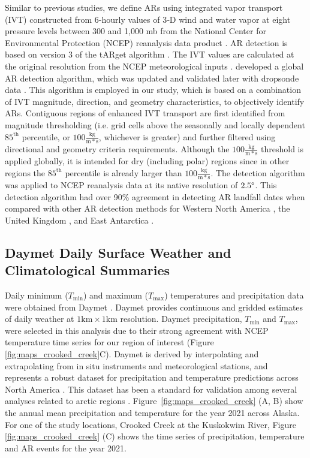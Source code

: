 \documentclass[12pts,draft]{AR_analysis_}
\begin{document}
Similar to previous studies, we define ARs using integrated vapor
transport (IVT) constructed from 6-hourly values of 3‐D wind and
water vapor at eight pressure levels between 300 and 1,000
mb from the National Center for Environmental Protection (NCEP) 
reanalysis data product \cite{NCEP_NCAR_reanalysis}. 
AR detection is based on version 3 of the tARget algorithm
\cite{Guan_Waliser2019, bin2022}.
The IVT values are calculated at the original
resolution from the NCEP
meteorological inputs \cite{NCEP_reanalysis}.
 developed a global
AR detection algorithm, which was updated and validated later with
dropsonde data \cite{guan2018}. This algorithm is employed in
our study, which is based on a combination of IVT magnitude,
direction, and geometry characteristics, to objectively identify ARs.
Contiguous regions of enhanced IVT transport are first identified from
magnitude thresholding (i.e. grid cells above the seasonally
and locally dependent $85^{\text{th}}$ percentile, or 
$\mathrm{100\frac{kg}{m*s}}$, 
whichever is greater) and further filtered
using directional and geometry criteria requirements. Although the 
$\mathrm{100\frac{kg}{m*s}}$ threshold is applied globally, it is intended for 
dry (including polar) regions since in other regions the $85^{\text{th}}$ percentile 
is already larger than $\mathrm{100\frac{kg}{m*s}}$. The detection
algorithm was applied to NCEP reanalysis data at its native resolution of $2.5 \degree$.
This detection algorithm had over 90\% agreement in detecting AR
landfall dates when compared with other AR detection methods for Western
North America \cite{Neiman2008}, the United Kingdom \cite{Lavers2011}, 
and East Antarctica \cite{Gorodetskaya2014}. 

\subsection{Daymet Daily Surface Weather and Climatological Summaries}

Daily minimum ($T_{\text{min}}$) and maximum ($T_{\text{max}}$) temperatures and 
precipitation data were obtained from Daymet \cite{Daymet}. 
Daymet provides continuous and gridded estimates of daily weather at
$\mathrm{1km \times 1km}$ resolution. Daymet precipitation, 
$T_{\text{min}}$ and $T_{\text{max}}$, were selected in this analysis
due to their strong agreement with NCEP temperature time series for our 
region of interest (Figure \ref{fig:maps_crooked_creek}C). 
Daymet is derived by interpolating and extrapolating from in situ instruments 
and meteorological stations, and represents a robust 
dataset for precipitation and temperature predictions across North
America \cite{daymet2021}. This dataset has been a standard for validation 
among several analyses related to arctic regions \cite{Diro2019, 
Akinsanola2024}. Figure~\ref{fig:maps_crooked_creek}
(A, B) show the annual mean precipitation and temperature for the year
2021 across Alaska. For one of the study locations, Crooked Creek at the
Kuskokwim River, Figure \ref{fig:maps_crooked_creek} (C)
shows the time series of precipitation, temperature and AR events for the
year 2021.
\end{document}
